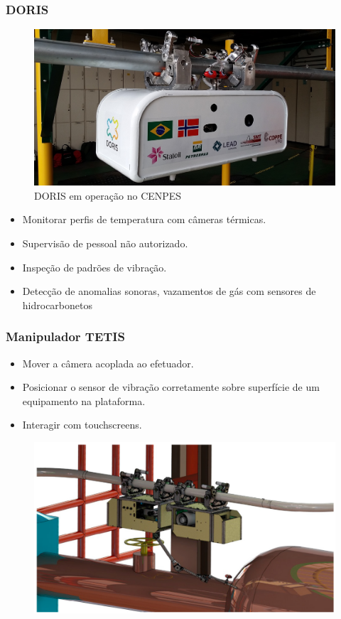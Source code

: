 \documentclass{beamer}
\begin{document}
\begin{frame}
\frametitle{DORIS}
\begin{figure}
\includegraphics[width=0.65\linewidth]{./img/doris_robot.jpg}
\caption{DORIS em operação no CENPES}
\end{figure}
\begin{itemize}
\item Monitorar perfis de temperatura com câmeras térmicas.
\item Supervisão de pessoal não autorizado.
\item Inspeção de padrões de vibração.
\item Detecção de anomalias sonoras, vazamentos de gás com sensores de hidrocarbonetos
\end{itemize}
\end{frame}


\begin{frame}
\frametitle{Manipulador TETIS}
\begin{itemize}
\item Mover a câmera acoplada ao efetuador.
\item Posicionar o sensor de vibração corretamente sobre superfície de um equipamento na plataforma.
\item Interagir com touchscreens. 
\end{itemize}
\begin{figure}
\includegraphics[width=0.7\linewidth]{./img/doris_manip.png}
\end{figure}
\end{frame}
\end{document}
